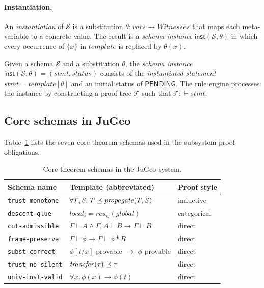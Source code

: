 \documentclass[11pt]{article}
\newcommand{\PTree}{\mathcal{T}}              %
\newcommand{\Schema}{\mathcal{S}}             %
\newcommand{\Inst}{\mathsf{inst}}             %
\newcommand{\Prov}[2]{#1 \vdash #2}           %
\begin{document}
\paragraph{Instantiation.}
An \emph{instantiation} of $\Schema$ is a substitution $\theta :
\mathit{vars} \to \mathit{Witnesses}$ that maps each meta-variable to a
concrete value.  The result is a \emph{schema instance}
$\Inst(\Schema, \theta)$ in which every occurrence of $\{x\}$ in
$\mathit{template}$ is replaced by $\theta(x)$.

\begin{definition}\label{def:schema-instance}
Given a schema $\Schema$ and a substitution $\theta$, the
\emph{schema instance} $\Inst(\Schema, \theta) = (\mathit{stmt}, \mathit{status})$
consists of the \emph{instantiated statement}
$\mathit{stmt} = \mathit{template}[\theta]$
and an initial status of $\mathsf{PENDING}$.
The rule engine processes the instance by constructing a proof tree
$\PTree$ such that $\PTree : \Prov{}{\mathit{stmt}}$.
\end{definition}

\subsection{Core schemas in JuGeo}

Table~\ref{tab:schemas} lists the seven core theorem schemas used in
the \JuGeo{} subsystem proof obligations.

\begin{table}[h]
\centering
\begin{tabular}{lll}
  \toprule
  Schema name & Template (abbreviated) & Proof style \\
  \midrule
  \texttt{trust-monotone}   &
    $\forall T, S.\; T \preceq \mathit{propagate}(T, S)$ & inductive \\
  \texttt{descent-glue}     &
    $\mathit{local}_i = \mathit{res}_{ij}(\mathit{global})$ & categorical \\
  \texttt{cut-admissible}   &
    $\Prov{\Gamma}{A} \wedge \Prov{\Gamma,A}{B} \to \Prov{\Gamma}{B}$ & direct \\
  \texttt{frame-preserve}   &
    $\Prov{\Gamma}{\phi} \to \Prov{\Gamma}{\phi * R}$ & direct \\
  \texttt{subst-correct}    &
    $\phi[t/x]$ provable $\to$ $\phi$ provable & direct \\
  \texttt{trust-no-silent}  &
    $\mathit{transfer}(\tau) \preceq \tau$ & direct \\
  \texttt{univ-inst-valid}  &
    $\forall x.\,\phi(x) \to \phi(t)$ & direct \\
  \bottomrule
\end{tabular}
\caption{Core theorem schemas in the JuGeo system.}
\label{tab:schemas}
\end{table}
\end{document}
